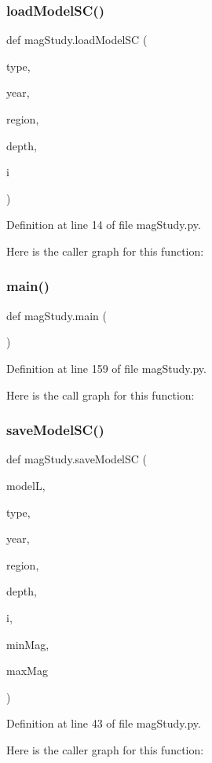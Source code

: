 \subsubsection{\texorpdfstring{load\+Model\+S\+C()}{loadModelSC()}}
{\footnotesize\ttfamily def mag\+Study.\+load\+Model\+SC (\begin{DoxyParamCaption}\item[{}]{type,  }\item[{}]{year,  }\item[{}]{region,  }\item[{}]{depth,  }\item[{}]{i }\end{DoxyParamCaption})}



Definition at line 14 of file mag\+Study.\+py.

Here is the caller graph for this function\+:
\mbox{\label{namespacemag_study_aedd1b63a589d0d25496c8cd0589fc46d}} 
\subsubsection{\texorpdfstring{main()}{main()}}
{\footnotesize\ttfamily def mag\+Study.\+main (\begin{DoxyParamCaption}{ }\end{DoxyParamCaption})}



Definition at line 159 of file mag\+Study.\+py.

Here is the call graph for this function\+:
\mbox{\label{namespacemag_study_a3ae21059e58cebe9b4cfb7f65a965c78}} 
\subsubsection{\texorpdfstring{save\+Model\+S\+C()}{saveModelSC()}}
{\footnotesize\ttfamily def mag\+Study.\+save\+Model\+SC (\begin{DoxyParamCaption}\item[{}]{modelL,  }\item[{}]{type,  }\item[{}]{year,  }\item[{}]{region,  }\item[{}]{depth,  }\item[{}]{i,  }\item[{}]{min\+Mag,  }\item[{}]{max\+Mag }\end{DoxyParamCaption})}



Definition at line 43 of file mag\+Study.\+py.

Here is the caller graph for this function\+:
